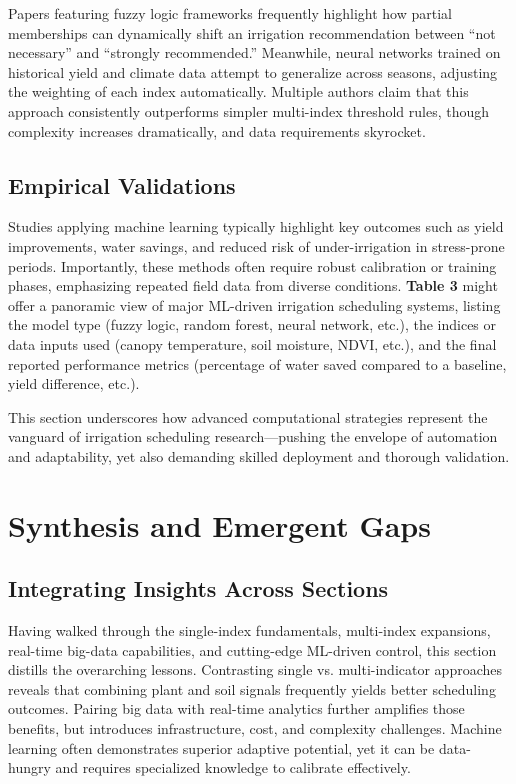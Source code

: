 \documentclass[12pt]{article}
\begin{document}
Papers featuring fuzzy logic frameworks frequently highlight how partial memberships can dynamically shift an irrigation recommendation between “not necessary” and “strongly recommended.” Meanwhile, neural networks trained on historical yield and climate data attempt to generalize across seasons, adjusting the weighting of each index automatically. Multiple authors claim that this approach consistently outperforms simpler multi-index threshold rules, though complexity increases dramatically, and data requirements skyrocket.

\subsection{Empirical Validations}
Studies applying machine learning typically highlight key outcomes such as yield improvements, water savings, and reduced risk of under-irrigation in stress-prone periods. Importantly, these methods often require robust calibration or training phases, emphasizing repeated field data from diverse conditions. \textbf{Table 3} might offer a panoramic view of major ML-driven irrigation scheduling systems, listing the model type (fuzzy logic, random forest, neural network, etc.), the indices or data inputs used (canopy temperature, soil moisture, NDVI, etc.), and the final reported performance metrics (percentage of water saved compared to a baseline, yield difference, etc.).

This section underscores how advanced computational strategies represent the vanguard of irrigation scheduling research—pushing the envelope of automation and adaptability, yet also demanding skilled deployment and thorough validation.



\section{Synthesis and Emergent Gaps}

\subsection{Integrating Insights Across Sections}
Having walked through the single-index fundamentals, multi-index expansions, real-time big-data capabilities, and cutting-edge ML-driven control, this section distills the overarching lessons. Contrasting single vs. multi-indicator approaches reveals that combining plant and soil signals frequently yields better scheduling outcomes. Pairing big data with real-time analytics further amplifies those benefits, but introduces infrastructure, cost, and complexity challenges. Machine learning often demonstrates superior adaptive potential, yet it can be data-hungry and requires specialized knowledge to calibrate effectively.
\end{document}
